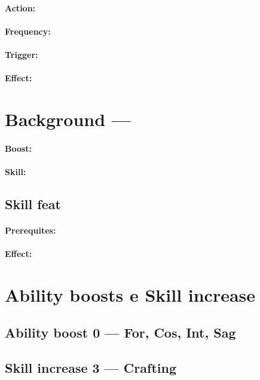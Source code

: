 \documentclass[
a4paper,
twoside,
11pt, 
openany,
]{memoir}
\begin{document}
\begin{multicols*}{2}
	\paragraph{Action:} 
	\paragraph{Frequency:} 
	\paragraph{Trigger:} 
	\paragraph{Effect:} 
	
	
	\section*{Background — }
	\paragraph{Boost:} 
	\paragraph{Skill:} 
	\subsection{Skill feat}
	\paragraph{Prerequites:} 
	\paragraph{Effect:} 

	
	\section*{Ability boosts e Skill increase}
	\subsection*{Ability boost 0 — For, Cos, Int, Sag}

	\subsection*{Skill increase 3 — Crafting}
	

\end{multicols*}
\end{document}
